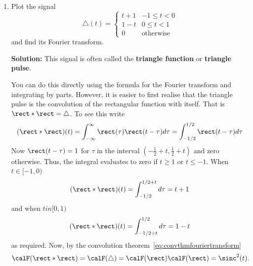 \documentclass[11pt,a4paper]{book}
\theoremstyle{plain}
\numberwithin{equation}{section}
\newcommand{\term}{\textbf}
\newcommand{\vtick}[1]{\draw (#1,-0.075) -- (#1,0.075) }
\newcommand{\htick}[1]{\draw (-0.075,#1) -- (0.075,#1)}
\newenvironment{solution}{\begin{footnotesize}\textbf{Solution:}}{\end{footnotesize}}
\newenvironment{excersizelist}{%
  \renewcommand*{\theenumi}{\thechapter.\arabic{enumi}}%
  \newcommand\itemadvanced{\stepcounter{enumi}\item[$\ast$\, \theenumi.]}
  \begin{enumerate}
}{%
  \end{enumerate}
}
\begin{document}
\begin{excersizelist}
\item \label{exer:triangle_pulse_ft} Plot the signal
\[
\bigtriangleup(t) = \begin{cases}
t + 1 & -1 \leq t < 0 \\
1 - t & 0 \leq t < 1 \\
0 & \text{otherwise}
\end{cases}
\]
and find its Fourier transform.
\begin{solution}
This signal is often called the \term{triangle function} or \term{triangle pulse}.
\begin{center}
\end{center}

You can do this directly using the formula for the Fourier transform and integrating by parts.  However, it is easier to first realise that the triangle pulse is the convolution of the rectangular function with itself.  That is $\rect * \rect = \bigtriangleup$.  To see this write
\[
(\rect * \rect)(t) = \int_{-\infty}^\infty \rect(\tau)\rect(t - \tau) d\tau = \int_{-1/2}^{1/2} \rect(t - \tau) d\tau
\] 
Now $\rect(t - \tau) = 1$ for $\tau$ in the interval $(-\tfrac{1}{2}+ t,\tfrac{1}{2} + t)$ and zero otherwise. 
Thus, the integral evaluates to zero if $t \geq 1$ or $t \leq -1$.  When $t \in [-1,0)$
\[
(\rect * \rect)(t) = \int_{-1/2}^{1/2+t} d\tau = t + 1
\]
and when $t in [0,1)$
\[
(\rect * \rect)(t) = \int_{-1/2+t}^{1/2} d\tau = 1 - t
\]
as required.  Now, by the convolution theorem~\eqref{eq:convthmfouriertransform}
\[
\calF(\rect * \rect) = \calF(\bigtriangleup) = \calF(\rect) \calF(\rect) = \sinc^2(t).
\]
\end{solution}


\end{excersizelist}
\end{document}
